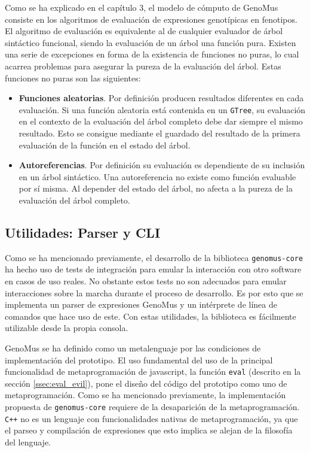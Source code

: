 Como se ha explicado en el capítulo 3, el modelo de cómputo de GenoMus consiste en los algoritmos de evaluación de expresiones genotípicas en fenotipos. El algoritmo de evaluación es equivalente al de cualquier evaluador de árbol sintáctico funcional, siendo la evaluación de un árbol una función pura. Existen una serie de excepciones en forma de la existencia de funciones no puras, lo cual acarrea problemas para asegurar la pureza de la evaluación del árbol. Estas funciones no puras son las siguientes:

\begin{itemize}
    \item \textbf{Funciones aleatorias}. Por definición producen resultados diferentes en cada evaluación. Si una función aleatoria está contenida en un \verb|GTree|, su evaluación en el contexto de la evaluación del árbol completo debe dar siempre el mismo resultado. Esto se consigue mediante el guardado del resultado de la primera evaluación de la función en el estado del árbol.
    
    \item \textbf{Autoreferencias}. Por definición su evaluación es dependiente de su inclusión en un árbol sintáctico. Una autoreferencia no existe como función evaluable por sí misma. Al depender del estado del árbol, no afecta a la pureza de la evaluación del árbol completo.
\end{itemize}

\subsection{Utilidades: Parser y CLI}

Como se ha mencionado previamente, el desarrollo de la biblioteca \verb|genomus-core| ha hecho uso de tests de integración para emular la interacción con otro software en casos de uso reales. No obstante estos tests no son adecuados para emular interacciones sobre la marcha durante el proceso de desarrollo. Es por esto que se implementa un parser de expresiones GenoMus y un intérprete de línea de comandos que hace uso de este. Con estas utilidades, la biblioteca es fácilmente utilizable desde la propia consola. 

GenoMus se ha definido como un metalenguaje por las condiciones de implementación del prototipo. El uso fundamental del uso de la principal funcionalidad de metaprogramación de javascript, la función \verb|eval| (descrito en la sección \ref{ssec:eval_evil}), pone el diseño del código del prototipo como uno de metaprogramación. Como se ha mencionado previamente, la implementación propuesta de \verb|genomus-core| requiere de la desaparición de la metaprogramación. \verb|C++| no es un lenguaje con funcionalidades nativas de metaprogramación, ya que el parseo y compilación de expresiones que esto implica se alejan de la filosofía del lenguaje.

